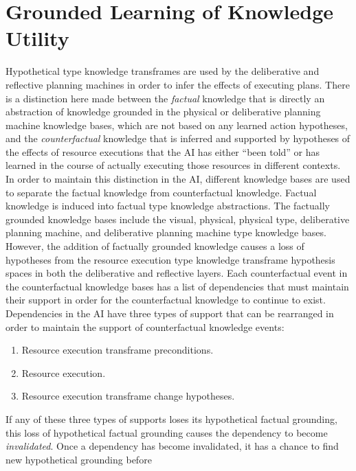 \chapter{Grounded Learning of Knowledge Utility}
\label{chapter:grounded_learning_of_knowledge_utility}

Hypothetical type knowledge transframes are used by the deliberative
and reflective planning machines in order to infer the effects of
executing plans.  There is a distinction here made between the
\emph{factual} knowledge that is directly an abstraction of knowledge
grounded in the physical or deliberative planning machine knowledge
bases, which are not based on any learned action hypotheses, and the
\emph{counterfactual} knowledge that is inferred and supported by
hypotheses of the effects of resource executions that the AI has
either ``been told'' or has learned in the course of actually
executing those resources in different contexts.  In order to maintain
this distinction in the AI, different knowledge bases are used to
separate the factual knowledge from counterfactual knowledge.  Factual
knowledge is induced into factual type knowledge abstractions.  The
factually grounded knowledge bases include the visual, physical,
physical type, deliberative planning machine, and deliberative
planning machine type knowledge bases.  However, the addition of
factually grounded knowledge causes a loss of hypotheses from the
resource execution type knowledge transframe hypothesis spaces in both
the deliberative and reflective layers.  Each counterfactual event in
the counterfactual knowledge bases has a list of dependencies that
must maintain their support in order for the counterfactual knowledge
to continue to exist.  Dependencies in the AI have three types of
support that can be rearranged in order to maintain the support of
counterfactual knowledge events:
\begin{enumerate}
\item Resource execution transframe preconditions.
\item Resource execution.
\item Resource execution transframe change hypotheses.
\end{enumerate}
If any of these three types of supports loses its hypothetical factual
grounding, this loss of hypothetical factual grounding causes the
dependency to become \emph{invalidated}.  Once a dependency has become
invalidated, it has a chance to find new hypothetical grounding before

